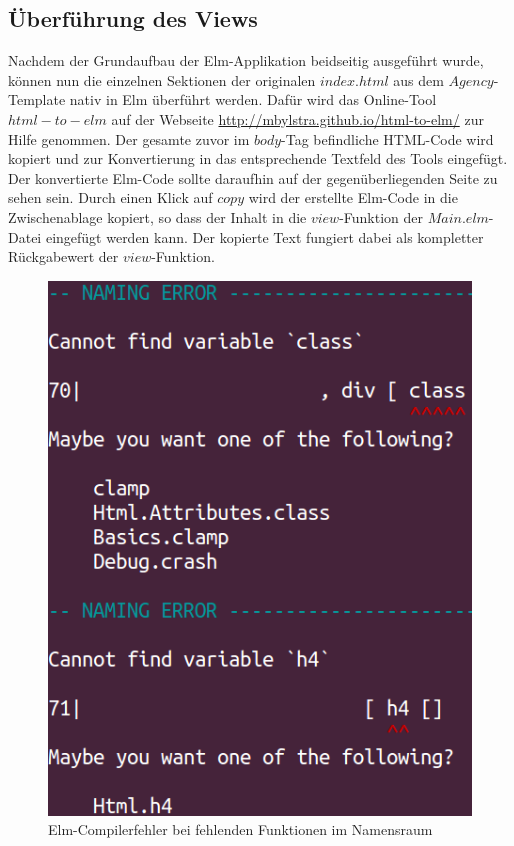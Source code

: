 \subsection{Überführung des Views}
\label{sec:ueberfuehrung-view}
Nachdem der Grundaufbau der Elm-Applikation beidseitig ausgeführt wurde, können nun die einzelnen Sektionen der originalen $index.html$ aus dem $Agency$-Template nativ in Elm überführt werden. Dafür wird das Online-Tool $html-to-elm$ auf der Webseite \url{http://mbylstra.github.io/html-to-elm/} zur Hilfe genommen. Der gesamte zuvor im $body$-Tag befindliche \ac{HTML}-Code wird kopiert und zur Konvertierung in das entsprechende Textfeld des Tools eingefügt. Der konvertierte Elm-Code sollte daraufhin auf der gegenüberliegenden Seite zu sehen sein. Durch einen Klick auf $copy$ wird der erstellte Elm-Code in die Zwischenablage kopiert, so dass der Inhalt in die $view$-Funktion der $Main.elm$-Datei eingefügt werden kann. Der kopierte Text fungiert dabei als kompletter Rückgabewert der $view$-Funktion.
\begin{figure}[h]
\centering
\includegraphics[scale=0.5]{img/elm-naming-error.png}
\caption{Elm-Compilerfehler bei fehlenden Funktionen im Namensraum}\label{fig:elm-naming-error}
\end{figure}
